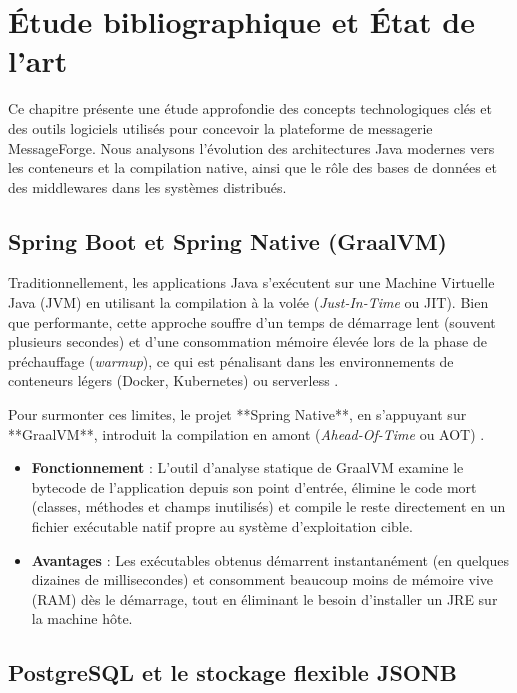 \chapter{Étude bibliographique et État de l'art}
\label{chapter:etat_de_l_art}

Ce chapitre présente une étude approfondie des concepts technologiques clés et des outils logiciels utilisés pour concevoir la plateforme de messagerie MessageForge. Nous analysons l'évolution des architectures Java modernes vers les conteneurs et la compilation native, ainsi que le rôle des bases de données et des middlewares dans les systèmes distribués.

\section{Spring Boot et Spring Native (GraalVM)}

Traditionnellement, les applications Java s'exécutent sur une Machine Virtuelle Java (JVM) en utilisant la compilation à la volée (\textit{Just-In-Time} ou JIT). Bien que performante, cette approche souffre d'un temps de démarrage lent (souvent plusieurs secondes) et d'une consommation mémoire élevée lors de la phase de préchauffage (\textit{warmup}), ce qui est pénalisant dans les environnements de conteneurs légers (Docker, Kubernetes) ou serverless \cite{springnative}.

Pour surmonter ces limites, le projet **Spring Native**, en s'appuyant sur **GraalVM**, introduit la compilation en amont (\textit{Ahead-Of-Time} ou AOT) \cite{graalvm}. 
\begin{itemize}
    \item \textbf{Fonctionnement} : L'outil d'analyse statique de GraalVM examine le bytecode de l'application depuis son point d'entrée, élimine le code mort (classes, méthodes et champs inutilisés) et compile le reste directement en un fichier exécutable natif propre au système d'exploitation cible.
    \item \textbf{Avantages} : Les exécutables obtenus démarrent instantanément (en quelques dizaines de millisecondes) et consomment beaucoup moins de mémoire vive (RAM) dès le démarrage, tout en éliminant le besoin d'installer un JRE sur la machine hôte.
\end{itemize}

\section{PostgreSQL et le stockage flexible JSONB}

